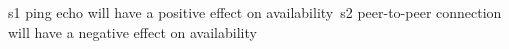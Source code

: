 
s1 ping echo will have a positive effect on availability\
s2 peer-to-peer connection will have a negative effect on availability\